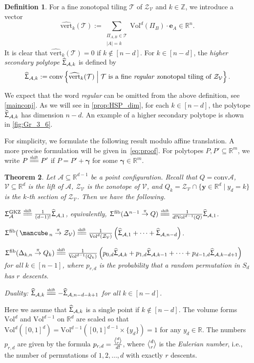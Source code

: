 \documentclass[11pt]{amsart}
\theoremstyle{plain}
\newtheorem{theorem}{Theorem}[section]
\theoremstyle{definition}
\newtheorem{definition}[theorem]{Definition}
\def\Z{\mathbb{Z}}
\def\R{\mathbb{R}}
\def\y{{\bm{y}}}
\def\A{\mathcal{A}}
\def\V{\mathcal{V}}
\def\ggamma{\bm{\gamma}}
\def\e{{\bm{e}}}
\def\conv{\mathrm{conv}}
\def\Conv{\mathrm{conv}}
\def\Zon{\mathcal{Z}}
\def\cube{\mbox{\,\mancube\,}}
\def\Vol{\mathrm{Vol}}
\def\GKZ{{\operatorname{GKZ}}}
\newcommand\wh[1]{\hstretch{2}{\hat{\hstretch{0.5}{#1}}}}
\def\vert{\mathrm{vert}}
\def\vertHSP{\wh\vert}
\def\vertHSP{\widehat{\vert}}
\def\HSP{\widehat\Upsigma}
\def\Sigma{\HSP}
\def\fiber{{\operatorname{fib}}}
\def\FibPoly{\Upsigma^\fiber}
\def\SigmaGKZ{\Upsigma_\A^{\GKZ}}
\def\pito{\overset \pi \to}
\def\VC{\V}
\def\Tcal{\mathcal{T}}
\def\Tiling{\Tcal}
\def\tile{\Pi}
\newcommand\shifteq{\stackrel{\mathclap{\normalfont\mbox{\scalebox{0.6}{shift}}}}{=\joinrel=}}
\newcommand\summa[2]{\sum_{\substack{#1 \\ #2}}}
\def\sumlevel#1{\summa{\tile_{A,B}\in\Tiling}{|A|=#1}}
\def\Voldd{\Vol^{d-1}}
\def\Vold{\Vol^d}
\def\VolX(#1){\Vol^d(\tile_{#1})}
\def\VolB{\VolX(B)}
\let\subset\subseteq
\newcommand{\Euli}{\genfrac{\langle}{\rangle}{0pt}{}}
\def\Eul(#1,#2){\Euli{#1}{#2}}
\begin{document}
\begin{definition}\label{def:HSP} 
 For a fine zonotopal tiling $\Tiling$ of $\Zon_\VC$ and $k\in\Z$, we introduce a vector
\begin{equation}\label{eq:HSP}
\vertHSP_k(\Tiling):=\sumlevel{k} \VolB\cdot  \e_A \in\R^n.
\end{equation}
\noindent It is clear that $\vertHSP_k(\Tiling)=0$ if $k\notin [n-d]$. For $k\in[n-d]$, the \emph{higher secondary polytope} $\Sigma_{\A,k}$ is defined by
\[\Sigma_{\A,k}:=\Conv\left\{\vertHSP_k(\Tiling)\;\middle|\;  \text{$\Tiling$ is a fine \emph{regular} zonotopal tiling of $\Zon_\VC$} \right\}.\]
\end{definition}
\noindent We expect that the word \emph{regular} can be omitted from the above definition, see \cref{mainconj}. 
 As we will see in \cref{prop:HSP_dim}, for each $k\in[n-d]$, the polytope $\Sigma_{\A,k}$ has dimension $n-d$. An example of a higher secondary polytope is shown in \cref{fig:Gr_3_6}.


For simplicity, we formulate the following result modulo affine translation.
A more precise formulation will be given in~\eqref{eq:proof}. For polytopes
$P,P'\subset\R^m$, we write $P\shifteq P'$ if $P=P'+{\ggamma}$ for some
$\ggamma\in\R^m$. 

\begin{theorem}\label{thm:sigma} 
Let $\A\subset\R^{d-1}$ be a point configuration. Recall that
$Q = \conv \A$, $\VC\subset\R^d$ is the lift of $\A$, $\Zon_\VC$ is the zonotope of $\VC$, and 
 $Q_k=\Zon_\VC\cap \{\y\in\R^d\mid y_d=k\}$ is the $k$-th section of $\Zon_\VC$. 
Then we have the following.
	\begin{theoremlist}
\item\label{thm:sigma_GKZ} 
	$\SigmaGKZ\shifteq \frac1{(d-1)!}\Sigma_{\A,1}$, equivalently, $\FibPoly(\Delta^{n-1}\pito Q)    \shifteq	\frac1{d! \Voldd(Q)}\Sigma_{\A,1}$.
	\item\label{thm:FibPoly}
  $\FibPoly(\cube_n\pito \Zon_\VC)\shifteq \frac1{\Vold(\Zon_\VC)} \left(\Sigma_{\A,1} + \cdots + \Sigma_{\A,n-d}\right)$.
\item\label{thm:FibPoly_k}
$\FibPoly(\Delta_{k,n}\pito Q_k) \shifteq
\frac1{\Voldd(Q_k)} \left(p_{0,d}\Sigma_{\A,k} + p_{1,d}\Sigma_{\A,k-1} + \dots + p_{d-1,d}\Sigma_{\A,k-d+1}\right)$ for all $k\in[n-1]$, where $p_{r,d}$ is the probability that a random permutation in $S_d$ has $r$ descents.
\item\label{thm:duality} 
\emph{Duality:} $\Sigma_{\A,k} \shifteq - \Sigma_{\A,n-d-k+1}$ for all $k\in[n-d]$.
\end{theoremlist}
\end{theorem}
\noindent Here we assume that $\Sigma_{\A,k}$ is a single point if $k\notin [n-d]$. The volume forms $\Vold$ and $\Voldd$ on $\R^d$ are scaled so that $\Vold([0,1]^d)=\Voldd([0,1]^{d-1}\times\{y_d\})=1$ for any $y_d\in\R$. The numbers $p_{r,d}$ are given by the formula $p_{r,d}=\frac{\Eul(d,r)}{d!}$, where $\Eul(d,r)$ is the \emph{Eulerian number}, i.e., the number of permutations of $1,2,\dots,d$ with exactly $r$ descents.
\end{document}
